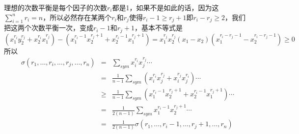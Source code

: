 \begin{example}[均值不等式]
  理想的次数平衡是每个因子的次数$r_i$都是1，如果不是如此的话，因为这$\sum_{i=1}^nr_i=n$，所以必然存在某两个$r_i$和$r_j$使得$r_i-1 \geqslant r_j+1$即$r_i - r_j \geqslant 2$，我们把这两个次数平衡一次，变成$r_i-1$和$r_j+1$，基本不等式是
  \begin{equation*}
  (x_1^{r_i}y_2^{r_j}+x_2^{r_i}x_1^{r_j})-(x_1^{r_i-1}x_2^{r_j+1}+x_2^{r_i-1}x_1^{r_j+1})=x_1^{r_j}x_2^{r_j}(x_1-x_2)(x_1^{r_i-r_j-1}-x_2^{r_i-r_j-1}) \geqslant 0
  \end{equation*}
  所以
  \begin{eqnarray*}
    \sigma(r_1,\ldots,r_i,\ldots,r_j,\ldots,r_n) & = & \sum_{sym}x_i^{r_i}x_j^{r_j}\cdots \\
 & = & \frac{1}{n-1} \sum_{sym}(x_i^{r_i}x_j^{r_j}+x_i^{r_j}x_j^{r_i})\cdots \\
 & \geqslant & \frac{1}{n-1} \sum_{sym} (x_1^{r_i-1}x_2^{r_j+1}+x_2^{r_i-1}x_1^{r_j+1})\cdots \\
                               & = & \frac{1}{2(n-1)} \sum_{sym}x_1^{r_i-1}x_2^{r_j+1}\cdots \\
    & = & \frac{1}{2(n-1)} \sigma(r_1,\ldots,r_i-1,\ldots,r_j+1,\ldots,r_n)
  \end{eqnarray*}
\end{example}

